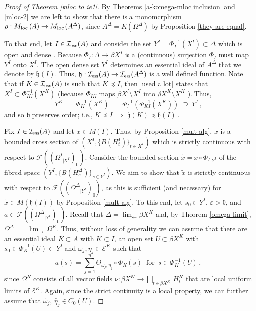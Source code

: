 \documentclass{amsart}
\theoremstyle{definition}
\theoremstyle{remark}
\begin{document}
\begin{proof}[Proof of Theorem \ref{mloc to ie1}] By Theorems \ref{a-komega-mloc inclusion} and \ref{mloc-2} we are left to show that there is a
monomorphism $\rho:{M_{\rm loc}\,}(A)\rightarrow {M_{\rm loc}\,}(A^\Delta)$, since $A^\Delta=K(\Omega^\Delta)$ by Proposition \ref{they are equal}.

To that end, let $I\in \mathcal I_{\rm ess}(A)$ and consider
the set $Y^I=\Phi_I^{-1}(X^I)\subset\Delta$ which is open and dense \cite[Lemma 1.1]{argerami--farenick--massey2009}.
Because $\Phi_I:\Delta\rightarrow \beta X^I$ is a (continuous) surjection $\Phi_I$ must map $Y^I$ onto $X^I$.
The  open dense set $Y^I$ determines an essential ideal of $A^\Delta$ that we denote by $\mathfrak h(I)$.
Thus, $\mathfrak h:  \mathcal I_{\rm ess}(A)\rightarrow  \mathcal I_{\rm ess}(A^\Delta)$ is a well defined function.
Note that if $K\in \mathcal I_{\rm ess}(A)$ is such that $K \preccurlyeq I$, then
\eqref{used a lot} states that
$X^I\subset\Phi_{KI}^{-1}(X^K)$
(because $\Phi_{KI}$ maps $\beta X^I\setminus X^I$ into $\beta X^K\setminus X^K$  \cite[Theorem 6.12]{Gillman-Jerison-book}). Thus,
\begin{equation}\label{incl inv-sets}
Y^K\;=\;\Phi_K^{-1}(X^K)\;=\;\Phi_I^{-1}\left( \Phi_{KI}^{-1}(X^K) \right) \;\supseteq\;Y^I\,,
\end{equation}
and so $\mathfrak h$ preserves order; i.e.,
$K \preccurlyeq I \;\Rightarrow\; \mathfrak h(K) \preccurlyeq \mathfrak h(I)\,.$
 

 Fix $I\in \mathcal I_{\rm ess}(A)$ and let $x\in M(I)$. Thus, by Proposition \ref{mult alg},
$x$ is a bounded cross
section of $(X^I,\{B(H^I_t)\}_{t\in X^I})$ which is strictly continuous with respect to ${\mathcal{F}}((\Omega^I{}_{\vert X^I})_0)$.
Consider the bounded section $\tilde x=x\circ\Phi_I{}_{\vert Y^I}$ of the fibred space
$(Y^I,\{B(H^\Delta_s)\}_{s\in Y^I})$. We aim to show that $\tilde x$ is strictly continuous with respect to
${\mathcal{F}}((\Omega^\Delta{}_{\vert Y^I})_{0})$, as this is sufficient (and necessary) for $\tilde x\in M(\mathfrak h(I))$ by Proposition \ref{mult alg}. To this end, let $s_0\in Y^I$, $\varepsilon>0$, and $a\in {\mathcal{F}}((\Omega^\Delta{}_{\vert Y^I})_{0})$. Recall that
$\Delta=\displaystyle\lim_{\leftarrow}\beta X^K$ and, by Theorem \ref{omega limit},  $\Omega^\Delta\;=\;\displaystyle\lim_{\rightarrow}\,\Omega^K$. Thus, without loss of generality we can assume that
 there are an essential ideal $K\subset A$ with $K\subset I$, an open set $U\subset \beta X^K$ with $s_0\in\Phi_K^{-1}(U)\subset Y^I$ and $\omega_j,\eta_j\in  \mathcal E^K$ such that $$a(s)=\displaystyle\sum_{j=1}^n\Theta_{\omega_j,\eta_j}\circ\Phi_K(s) \ \text{ for }\ s\in \Phi_K^{-1}(U)\,,$$ since
 $\Omega^K$ consists of all vector fields $\nu:\beta X^K \rightarrow \bigsqcup_{t\in \beta X^K}\,H_t^K$ that are local uniform limits of $\mathcal E^K$. Again, since the strict continuity is a local property, we can further assume that $\check{\omega_j},\,\check{\eta_j}\in C_0(U)$.


\end{proof}
\end{document}
